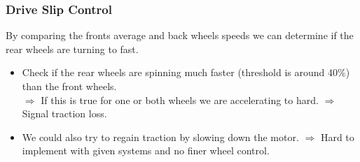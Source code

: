 \documentclass{beamer}
\begin{document}
\begin{frame}
    \frametitle{Drive Slip Control}
    By comparing the fronts average and back wheels speeds we can determine if the rear wheels are turning to fast. 
    \begin{itemize}
     \item Check if the rear wheels are spinning much faster (threshold is around 40\%) than the front wheels.\\
     $\Rightarrow$ If this is true for one or both wheels we are accelerating to hard.
     $\Rightarrow$ Signal traction loss.
     \item We could also try to regain traction by slowing down the motor.
     $\Rightarrow$ Hard to implement with given systems and no finer wheel control. \\
    \end{itemize}
\end{frame}
\end{document}
